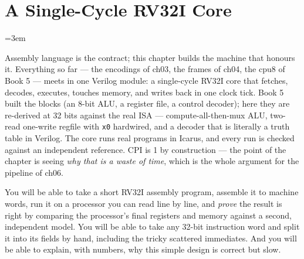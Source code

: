 \chapter{A Single-Cycle RV32I Core}
\label{ch:sc05}
\emergencystretch=3em

Assembly language is the contract; this chapter builds the machine
that honours it. Everything so far --- the encodings of ch03, the
frames of ch04, the cpu8 of Book 5 --- meets in one Verilog module:
a single-cycle RV32I core that fetches, decodes, executes, touches
memory, and writes back in one clock tick. Book 5 built the blocks
(an 8-bit ALU, a register file, a control decoder); here they are
re-derived at 32 bits against the real ISA --- compute-all-then-mux
ALU, two-read one-write regfile with \texttt{x0} hardwired, and a
decoder that is literally a truth table in Verilog. The core runs real
programs in Icarus, and every run is checked against an independent
reference. CPI is 1 by construction --- the point of the chapter is
seeing \emph{why that is a waste of time}, which is the whole argument
for the pipeline of ch06.

\begin{wins}
You will be able to take a short RV32I assembly program, assemble it
to machine words, run it on a processor you can read line by line,
and \emph{prove} the result is right by comparing the processor's
final registers and memory against a second, independent model. You
will be able to take any 32-bit instruction word and split it into
its fields by hand, including the tricky scattered immediates. And
you will be able to explain, with numbers, why this simple design is
correct but slow.
\end{wins}

